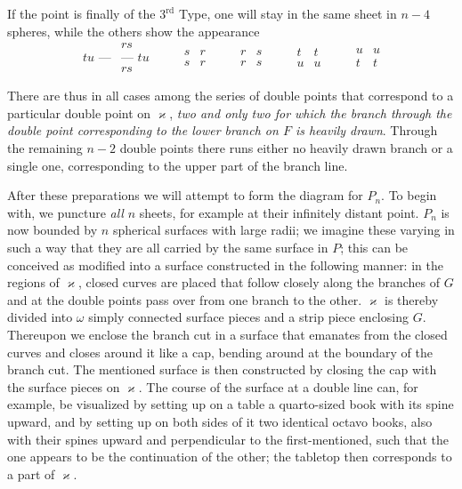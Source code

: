 \documentclass{article}
\begin{document}
If the point is finally of the $3^{\text{rd}}$ Type, one will stay in the same sheet in $n-4$ spheres, while the others show the appearance
\[
\begin{array}{c|c}
& rs \\
tu\text{ ---} & \text{--- } tu \\
& rs
\end{array}
\qquad
\begin{array}{c||c}
s & r \\
\hline
s & r
\end{array}
\qquad
\begin{array}{c||c}
r & s \\
\hline
r & s
\end{array}
\qquad
\begin{array}{c|c}
t & t \\
\hline\hline
u & u
\end{array}
\qquad
\begin{array}{c|c}
u & u \\
\hline\hline
t & t
\end{array}
\]

There are thus in all cases among the series of double points that correspond to a particular double point on $\varkappa$, \emph{two and only two for which the branch through the double point corresponding to the lower branch on $F$ is heavily drawn}. Through the remaining $n - 2$ double points there runs either no heavily drawn branch or a single one, corresponding to the upper part of the branch line.

After these preparations we will attempt to form the diagram for $P_n$. To begin with, we puncture \emph{all} $n$ sheets, for example at their infinitely distant point. $P_n$ is now bounded by $n$ spherical surfaces with large radii; we imagine these varying in such a way that they are all carried by the same surface in $P$; this can be conceived as modified into a surface constructed in the following manner: in the regions of $\varkappa$, closed curves are placed that follow closely along the branches of $G$ and at the double points pass over from one branch to the other. $\varkappa$ is thereby divided into $\omega$ simply connected surface pieces and a strip piece enclosing $G$. Thereupon we enclose the branch cut in a surface that emanates from the closed curves and closes around it like a cap, bending around at the boundary of the branch cut. The mentioned surface is then constructed by closing the cap with the surface pieces on $\varkappa$. The course of the surface at a double line can, for example, be visualized by setting up on a table a quarto-sized book with its spine upward, and by setting up on both sides of it two identical octavo books, also with their spines upward and perpendicular to the first-mentioned, such that the one appears to be the continuation of the other; the tabletop then corresponds to a part of $\varkappa$.
\end{document}
